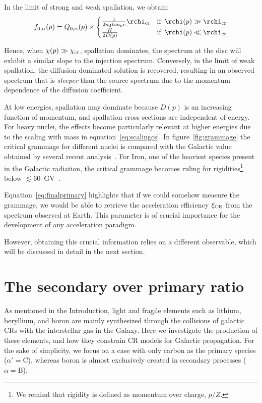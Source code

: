 In the limit of strong and weak spallation, we obtain:
%
\begin{equation}
f_{0,\alpha}(p) = Q_{0,\alpha}(p) \times
\begin{cases}
\frac{1}{2n_{\rm d}hm_{\rm p}c}\rchi_{\rm cr} & \text{if } \, \rchi(p) \gg \rchi_{\rm cr} \\
\frac{H}{2D(p)} & \text{if } \, \rchi(p) \ll \rchi_{\rm cr}
\end{cases}
\end{equation}

Hence, when $\chi(p)\gg \chi_{\rm cr}$, spallation dominates, the spectrum at the disc will exhibit a similar slope to the injection spectrum. Conversely, in the limit of weak spallation, the diffusion-dominated solution is recovered, resulting in an observed spectrum that is \emph{steeper} than the source spectrum due to the momentum dependence of the diffusion coefficient.

At low energies, spallation may dominate because $D(p)$ is an increasing function of momentum, and spallation cross sections are independent of energy. For heavy nuclei, the effects become particularly relevant at higher energies due to the scaling with mass in equation~\eqref{eq:scalingcs}. In figure~\ref{fig:grammage} the critical grammage for different nuclei is compared with the Galactic value obtained by several recent analysis~\cite{Evoli2019prd,Weinrich2020aa}. For Iron, one of the heaviest species present in the Galactic radiation, the critical grammage becomes ruling for rigidities\footnote{We remind that rigidity is defined as momentum over charge, $p/Z$.} below $\lesssim 60$~GV~\cite{Schroer2021prd}.

Equation~\eqref{eq:finalprimary} highlights that if we could somehow measure the grammage, we would be able to retrieve the acceleration efficiency $\xi_{\rm CR}$ from the spectrum observed at Earth. This parameter is of crucial importance for the development of any acceleration paradigm.

However, obtaining this crucial information relies on a different observable, which will be discussed in detail in the next section.

\section{The secondary over primary ratio}
\label{sec:secondaryoverprimary}

As mentioned in the Introduction, light and fragile elements such as lithium, beryllium, and boron are mainly synthesized through the collisions of galactic CRs with the interstellar gas in the Galaxy. Here we investigate the production of these elements, and how they constrain CR models for Galactic propagation. 
%
For the sake of simplicity, we focus on a case with only carbon as the primary species ($\alpha' = \text{C}$), whereas boron is almost exclusively created in secondary processes ($\alpha = \text{B}$).

